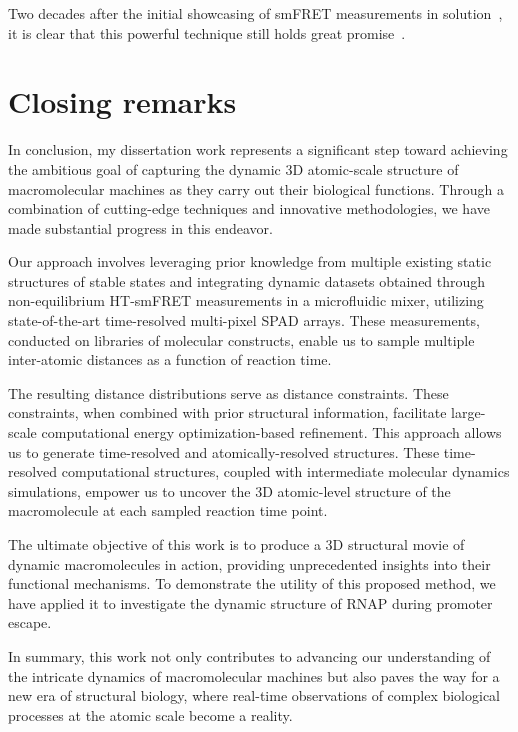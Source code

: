 Two decades after the initial showcasing of smFRET measurements in solution~\cite{deniz_PNAS_1999}, it is clear that this powerful technique still holds great promise~\cite{lerner_Science_2018}.


\section{Closing remarks}
\label{sec:closing_remarks}

In conclusion, my dissertation work represents a significant step toward achieving the ambitious goal of capturing the dynamic 3D atomic-scale structure of macromolecular machines as they carry out their biological functions. 
Through a combination of cutting-edge techniques and innovative methodologies, we have made substantial progress in this endeavor.

Our approach involves leveraging prior knowledge from multiple existing static structures of stable states and integrating dynamic datasets obtained through non-equilibrium \ac{HT-smFRET} measurements in a microfluidic mixer, utilizing state-of-the-art time-resolved multi-pixel \ac{SPAD} arrays. 
These measurements, conducted on libraries of molecular constructs, enable us to sample multiple inter-atomic distances as a function of reaction time.

The resulting distance distributions serve as distance constraints. 
These constraints, when combined with prior structural information, facilitate large-scale computational energy optimization-based refinement. 
This approach allows us to generate time-resolved and atomically-resolved structures. 
These time-resolved computational structures, coupled with intermediate molecular dynamics simulations, empower us to uncover the 3D atomic-level structure of the macromolecule at each sampled reaction time point.

The ultimate objective of this work is to produce a 3D structural movie of dynamic macromolecules in action, providing unprecedented insights into their functional mechanisms. 
To demonstrate the utility of this proposed method, we have applied it to investigate the dynamic structure of \ac{RNAP} during promoter escape.

In summary, this work not only contributes to advancing our understanding of the intricate dynamics of macromolecular machines but also paves the way for a new era of structural biology, where real-time observations of complex biological processes at the atomic scale become a reality.
   